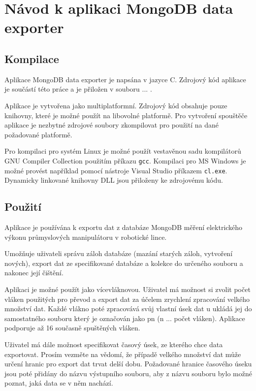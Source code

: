 \chapter{Návod k aplikaci MongoDB data exporter}
\label{appendix1}
\section{Kompilace}

Aplikace MongoDB data exporter je napsána v jazyce C. Zdrojový kód aplikace je součástí této práce a je přiložen v souboru ... .

Aplikace je vytvořena jako multiplatformní. Zdrojový kód obsahuje pouze knihovny, které je možné použít na libovolné platformě. Pro vytvoření spouštěče aplikace je nezbytné zdrojové soubory zkompilovat pro použití na dané požadované platformě.

Pro kompilaci pro systém Linux je možné použít vestavěnou sadu kompilátorů GNU Compiler Collection použitím příkazu \texttt{gcc}. Kompilaci pro MS Windows je možné provést například pomocí nástroje Visual Studio příkazem \texttt{cl.exe}. Dynamicky linkované knihovny DLL jsou přiloženy ke zdrojovému kódu.  

\section{Použití}

Aplikace je používána k exportu dat z databáze MongoDB měření elektrického výkonu průmyslových manipulátoru v robotické lince.

Umožňuje uživateli správu záloh databáze (mazání starých záloh, vytvoření nových), export dat ze specifikované databáze a kolekce do určeného souboru a nakonec její čištění.

Aplikaci je možné použít jako vícevláknovou. Uživatel má možnost si zvolit počet vláken použitých pro převod a export dat za účelem zrychlení zpracování velkého množství dat. Každé vlákno poté zpracovává svůj vlastní úsek dat u ukládá jej do samostatného souboru který je označován jako pn (n ... počet vláken). Aplikace podporuje až 16 současně spuštěných vláken. 

Uživatel má dále možnost specifikovat časový úsek, ze kterého chce data exportovat. Prosím vezměte na vědomí, že případě velkého množství dat může určení hranic pro export dat trvat delší dobu. Požadované hranice časového úseku jsou poté přidány do názvu výstupního souboru, aby z názvu souboru bylo možné poznat, jaká data se v něm nachází.

